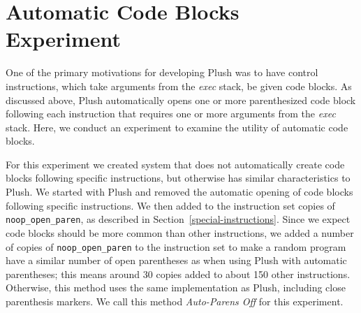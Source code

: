 \documentclass[graybox]{svmult}
\begin{document}






\section{Automatic Code Blocks Experiment}

One of the primary motivations for developing Plush was to have control instructions, which take arguments from the \textit{exec} stack, be given code blocks. As discussed above, Plush automatically opens one or more parenthesized code block following each instruction that requires one or more arguments from the \textit{exec} stack. Here, we conduct an experiment to examine the utility of automatic code blocks.

For this experiment we created system that does not automatically create code blocks following specific instructions, but otherwise has similar characteristics to Plush. We started with Plush and removed the automatic opening of code blocks following specific instructions. We then added to the instruction set copies of \texttt{noop\_open\_paren}, as described in Section~\ref{special-instructions}. Since we expect code blocks should be more common than other instructions, we added a number of copies of \texttt{noop\_open\_paren} to the instruction set to make a random program have a similar number of open parentheses as when using Plush with automatic parentheses; this means around 30 copies added to about 150 other instructions. Otherwise, this method uses the same implementation as Plush, including close parenthesis markers. We call this method \textit{Auto-Parens Off} for this experiment.
\end{document}
